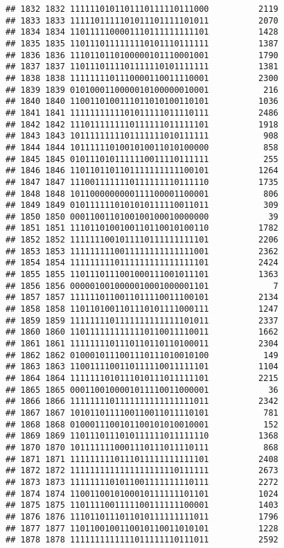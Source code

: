 \documentclass[]{article}
\begin{document}
\begin{verbatim}
## 1832 1832 1111110101101110111110111000          2119
## 1833 1833 1111101111101011101111101011          2070
## 1834 1834 1101111100001110111111111101          1428
## 1835 1835 1101110111111110101110111111          1387
## 1836 1836 1110110110100000101110001001          1790
## 1837 1837 1101110111101111110101111111          1381
## 1838 1838 1111111101110000110011110001          2300
## 1839 1839 0101000110000010100000010001           216
## 1840 1840 1100110100111011010100110101          1036
## 1841 1841 1111111111101011111011110111          2486
## 1842 1842 1110111111110111111011111101          1918
## 1843 1843 1011111111101111111010111111           908
## 1844 1844 1011111101001010011010100000           858
## 1845 1845 0101110101111110011110111111           255
## 1846 1846 1101101101101111111111100101          1264
## 1847 1847 1110011111110111111110111110          1735
## 1848 1848 1011000000000111100001100001           806
## 1849 1849 0101111110101010111110011011           309
## 1850 1850 0001100110100100100010000000            39
## 1851 1851 1110110100100110110010100110          1782
## 1852 1852 1111111001011110111111111101          2206
## 1853 1853 1111111110011111111111111001          2362
## 1854 1854 1111111110111111111111111101          2424
## 1855 1855 1101110111001000111001011101          1363
## 1856 1856 0000010010000010001000001101             7
## 1857 1857 1111110110011011110011100101          2134
## 1858 1858 1101101001101110101111000111          1247
## 1859 1859 1111111101111111111111101011          2337
## 1860 1860 1101111111111110110011110011          1662
## 1861 1861 1111111101110110110110100011          2304
## 1862 1862 0100010111001110111010010100           149
## 1863 1863 1100111100110111110011111101          1104
## 1864 1864 1111111010111010111011111101          2215
## 1865 1865 0001100100001011110011000001            36
## 1866 1866 1111111101111111111111111011          2342
## 1867 1867 1010110111100110011011110101           781
## 1868 1868 0100011100101100101010010001           152
## 1869 1869 1101110111010111111011111110          1368
## 1870 1870 1011111110001110111011110111           868
## 1871 1871 1111111110111011111111111101          2408
## 1872 1872 1111111111111111111110111111          2673
## 1873 1873 1111111101011001111111110111          2272
## 1874 1874 1100110010100010111111101101          1024
## 1875 1875 1101111001111100111111100001          1403
## 1876 1876 1110110111011010111111111011          1796
## 1877 1877 1101100100110010110011010101          1228
## 1878 1878 1111111111111011111110111011          2592

\end{verbatim}
\end{document}
